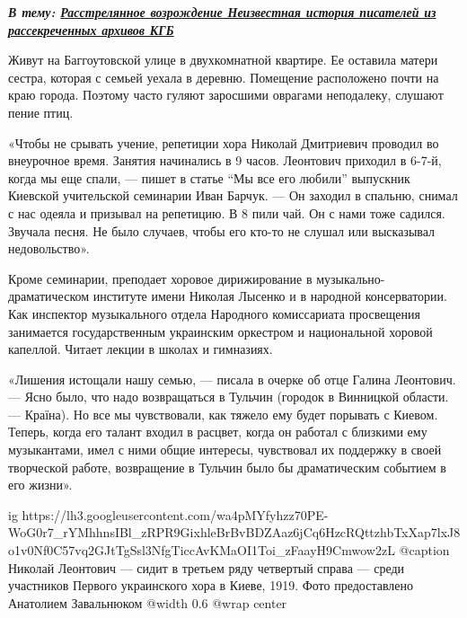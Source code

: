\begin{leftbar}
  \begingroup
    \em\Large\bfseries\color{blue}
В тему: \href{http://argumentua.com/stati/rasstrelyannoe-vozrozhdenie-neizvestnaya-istoriya-pisatelei-iz-rassekrechennykh-arkhivov-kgb}{Расстрелянное возрождение Неизвестная история писателей из рассекреченных архивов КГБ}
  \endgroup
\end{leftbar}

Живут на Баггоутовской улице в двухкомнатной квартире. Ее оставила матери
сестра, которая с семьей уехала в деревню. Помещение расположено почти на краю
города. Поэтому часто гуляют заросшими оврагами неподалеку, слушают пение птиц.

«Чтобы не срывать учение, репетиции хора Николай Дмитриевич проводил во
внеурочное время. Занятия начинались в 9 часов. Леонтович приходил в 6-7-й,
когда мы еще спали, — пишет в статье \enquote{Мы все его любили} выпускник Киевской
учительской семинарии Иван Барчук. — Он заходил в спальню, снимал с нас одеяла
и призывал на репетицию. В 8 пили чай. Он с нами тоже садился. Звучала песня.
Не было случаев, чтобы его кто-то не слушал или высказывал недовольство».

Кроме семинарии, преподает хоровое дирижирование в музыкально-драматическом
институте имени Николая Лысенко и в народной консерватории. Как инспектор
музыкального отдела Народного комиссариата просвещения занимается
государственным украинским оркестром и национальной хоровой капеллой. Читает
лекции в школах и гимназиях.


«Лишения истощали нашу семью, — писала в очерке об отце Галина Леонтович. —
Ясно было, что надо возвращаться в Тульчин (городок в Винницкой области. —
Країна). Но все мы чувствовали, как тяжело ему будет порывать с Киевом. Теперь,
когда его талант входил в расцвет, когда он работал с близкими ему музыкантами,
имел с ними общие интересы, чувствовал их поддержку в своей творческой работе,
возвращение в Тульчин было бы драматическим событием в его жизни».

\ifcmt
  ig https://lh3.googleusercontent.com/wa4pMYfyhzz70PE-WoG0r7_rYMhhnsIBl_zRPR9GixhleBrBvBDZAaz6jCq6HzcRQttzhbTxXap7lxJ8o1v0Nf0C57vq2GJtTgSsl3NfgTiccAvKMaOI1Toi_zFaayH9Cmwow2zL
	@caption Николай Леонтович — сидит в третьем ряду четвертый справа — среди участников Первого украинского хора в Киеве, 1919. Фото предоставлено Анатолием Завальнюком
	@width 0.6
	@wrap center
\fi


